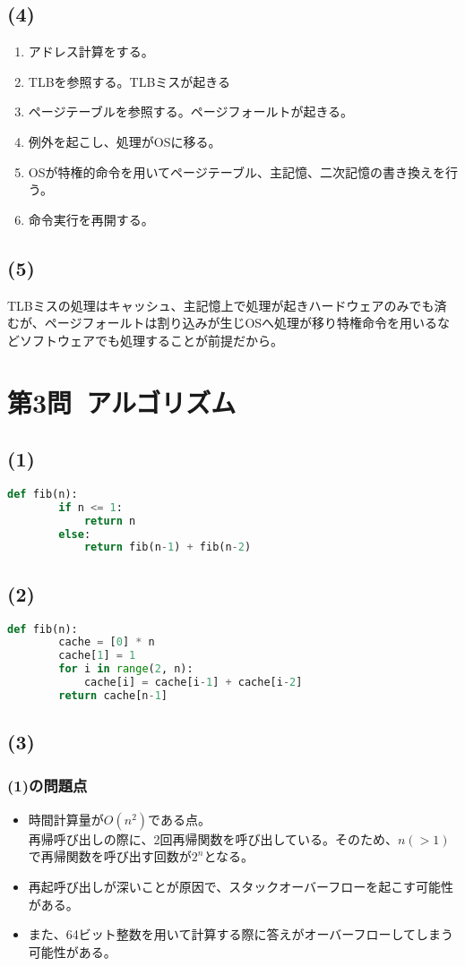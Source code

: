 \documentclass[a4paper,12pt,xelatex,ja=standard]{bxjsarticle}
\begin{document}
  \subsection*{(4)}
  \begin{enumerate}
    \item アドレス計算をする。
    \item TLBを参照する。TLBミスが起きる
    \item ページテーブルを参照する。ページフォールトが起きる。
    \item 例外を起こし、処理がOSに移る。
    \item OSが特権的命令を用いてページテーブル、主記憶、二次記憶の書き換えを行う。
    \item 命令実行を再開する。
  \end{enumerate}
  \subsection*{(5)}
  TLBミスの処理はキャッシュ、主記憶上で処理が起きハードウェアのみでも済むが、ページフォールトは割り込みが生じOSへ処理が移り特権命令を用いるなどソフトウェアでも処理することが前提だから。

\newpage
\section*{第3問\ アルゴリズム}
  \subsection*{(1)}
  \begin{lstlisting}[language=Python, caption=再帰呼び出し]
    def fib(n):
        if n <= 1:
            return n
        else:
            return fib(n-1) + fib(n-2)
  \end{lstlisting}
  \subsection*{(2)}
  \begin{lstlisting}[language=Python, caption=動的計画法]
    def fib(n):
        cache = [0] * n
        cache[1] = 1
        for i in range(2, n):
            cache[i] = cache[i-1] + cache[i-2]
        return cache[n-1]
  \end{lstlisting}
  \subsection*{(3)}
    \subsubsection*{(1)の問題点}
    \begin{itemize}
      \item 時間計算量が\(O(n^2)\)である点。\\
        再帰呼び出しの際に、2回再帰関数を呼び出している。そのため、\(n (> 1)\)で再帰関数を呼び出す回数が\(2^n\)となる。
      \item 再起呼び出しが深いことが原因で、スタックオーバーフローを起こす可能性がある。
      \item また、64ビット整数を用いて計算する際に答えがオーバーフローしてしまう可能性がある。
    \end{itemize}
\end{document}
